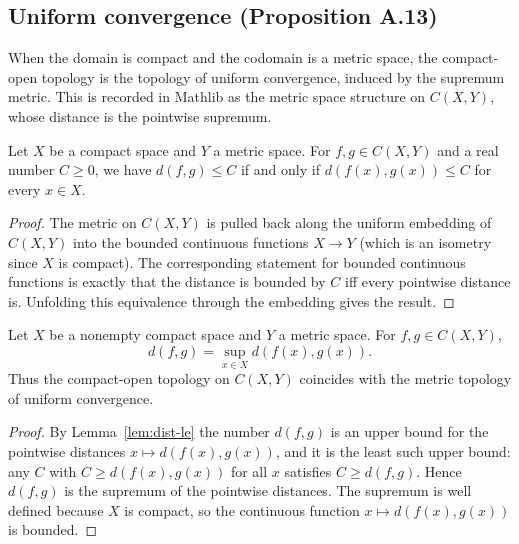 \subsection{Uniform convergence (Proposition A.13)}

When the domain is compact and the codomain is a metric space, the compact-open
topology is the topology of uniform convergence, induced by the supremum metric.
This is recorded in Mathlib as the metric space structure on $C(X, Y)$, whose
distance is the pointwise supremum.

\begin{lemma}
    \label{lem:dist-le}
    \leanok
    Let $X$ be a compact space and $Y$ a metric space. For $f, g \in C(X, Y)$
    and a real number $C \ge 0$, we have $d(f, g) \le C$ if and only if
    $d(f(x), g(x)) \le C$ for every $x \in X$.
\end{lemma}
\begin{proof}
    The metric on $C(X, Y)$ is pulled back along the uniform embedding of
    $C(X, Y)$ into the bounded continuous functions $X \to Y$ (which is an
    isometry since $X$ is compact). The corresponding statement for bounded
    continuous functions is exactly that the distance is bounded by $C$ iff
    every pointwise distance is. Unfolding this equivalence through the
    embedding gives the result.
\end{proof}

\begin{proposition}
    \label{prop:dist-eq-isup}
    \leanok
    Let $X$ be a nonempty compact space and $Y$ a metric space. For
    $f, g \in C(X, Y)$,
    \[
        d(f, g) = \sup_{x \in X} d(f(x), g(x)).
    \]
    Thus the compact-open topology on $C(X, Y)$ coincides with the metric
    topology of uniform convergence.
\end{proposition}
\begin{proof}
    By Lemma~\ref{lem:dist-le} the number $d(f, g)$ is an upper bound for the
    pointwise distances $x \mapsto d(f(x), g(x))$, and it is the least such
    upper bound: any $C$ with $C \ge d(f(x), g(x))$ for all $x$ satisfies
    $C \ge d(f, g)$. Hence $d(f, g)$ is the supremum of the pointwise
    distances. The supremum is well defined because $X$ is compact, so the
    continuous function $x \mapsto d(f(x), g(x))$ is bounded.
\end{proof}

